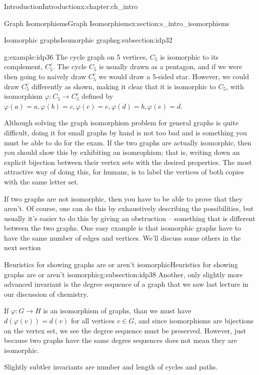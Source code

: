 \documentclass[oneside,10pt,]{book}
\numberwithin{equation}{section}
\begin{document}
\begin{chapterptx}{Introduction}{}{Introduction}{}{}{x:chapter:ch_intro}
\begin{sectionptx}{Graph Isomorphisms}{}{Graph Isomorphisms}{}{}{x:section:s_intro_isomorphisms}
\begin{subsectionptx}{Isomorphic graphs}{}{Isomorphic graphs}{}{}{g:subsection:idp32}
\begin{example}{}{g:example:idp36}
The cycle graph on 5 vertices, \(C_5\) is isomorphic to its complement, \(C_5^c\).  The cycle \(C_5\) is usually drawn as a pentagon, and if we were then going to naively draw \(C_5^c\) we would draw a 5-sided star.  However, we could draw \(C_5^c\) differently as shown, making it clear that it is isomorphic to \(C_5\), with isomorphism \(\varphi:C_5\to C_5^c\) defined by \(\varphi(a)=a, \varphi(b)=c, \varphi(c)=e, \varphi(d)=b, \varphi(e)=d\).%
\end{example}
Although solving the graph isomorphism problem for general graphs is quite difficult, doing it for small graphs by hand is not too bad and is something you must be able to do for the exam.  If the two graphs are actually isomorphic, then you should show this by exhibiting an isomrophism; that is, writing down an explicit bijection between their vertex sets with the desired properties. The most attractive way of doing this, for humans, is to label the vertices of both copies with the same letter set.%
\par
If two graphs are not isomorphic, then you have to be able to prove that they aren't. Of course, one can do this by exhaustively describing the possibilities, but usually it's easier to do this by giving an obstruction – something that is different between the two graphs. One easy example is that isomorphic graphs have to have the same number of edges and vertices. We'll discuss some others in the next section%
\end{subsectionptx}
%
%
\typeout{************************************************}
\typeout{************************************************}
%
\begin{subsectionptx}{Heuristics for showing graphs are or aren't isomorphic}{}{Heuristics for showing graphs are or aren't isomorphic}{}{}{g:subsection:idp38}
Another, only slightly more advanced invariant is the degree sequence of a graph that we saw last lecture in our discussion of chemistry.%
\par
If \(\varphi:G\to H\) is an isomorphism of graphs, than we must have \(d(\varphi(v))=d(v)\) for all vertices \(v\in G\), and since isomorphisms are bijections on the vertex set, we see the degree sequence must be preserved.  However, just because two graphs have the same degree sequences does not mean they are isomorphic.%
\par
Slightly subtler invariants are number and length of cycles and paths.%
\end{subsectionptx}

\end{sectionptx}
\end{chapterptx}
\end{document}
